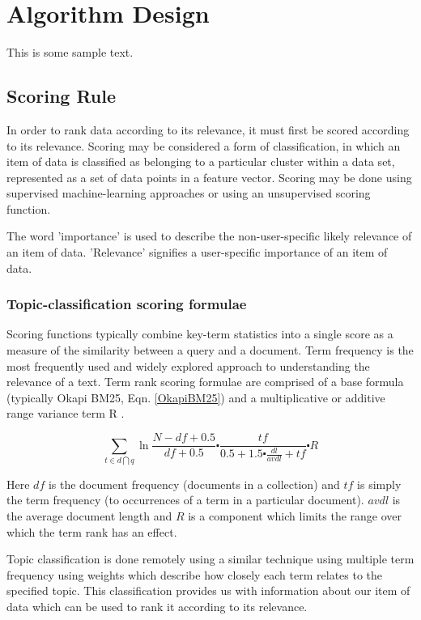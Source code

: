 \chapter{Algorithm Design}

This is some sample text.

\section{Scoring Rule}

In order to rank data according to its relevance, it must first be scored according to its relevance. Scoring may be considered a form of classification, in which an item of data is classified as belonging to a particular cluster within a data set, represented as a set of data points in a feature vector. Scoring may be done using supervised machine-learning approaches or using an unsupervised scoring function. 

The word 'importance' is used to describe the non-user-specific likely relevance of an item of data. 'Relevance' signifies a user-specific importance of an item of data.

\subsection{Topic-classification scoring formulae}

Scoring functions typically combine key-term statistics into a single score as a measure of the similarity between a query and a document.
Term frequency is the most frequently used and widely explored approach to understanding the relevance of a text. Term rank scoring formulae are comprised of a base formula (typically Okapi BM25, Eqn. \ref{OkapiBM25}) and a multiplicative or additive range variance term R \cite{OkapiBM25Paper}.

\begin{equation}\label{OkapiBM25}
	\sum\limits_{t\in d \bigcap q} \ln{\frac{N-df+0.5}{df+0.5}}\centerdot \frac{tf}{0.5+1.5 \centerdot \frac{dl}{avdl}+tf} \centerdot R
\end{equation}

Here $df$ is the document frequency (documents in a collection) and $tf$ is simply the term frequency (to occurrences of a term in a particular document). $avdl$ is the average document length and $R$ is a component which limits the range over which the term rank has an effect. 

Topic classification is done remotely using a similar technique using multiple term frequency using weights which describe how closely each term relates to the specified topic. This classification provides us with information about our item of data which can be used to rank it according to its relevance. 

